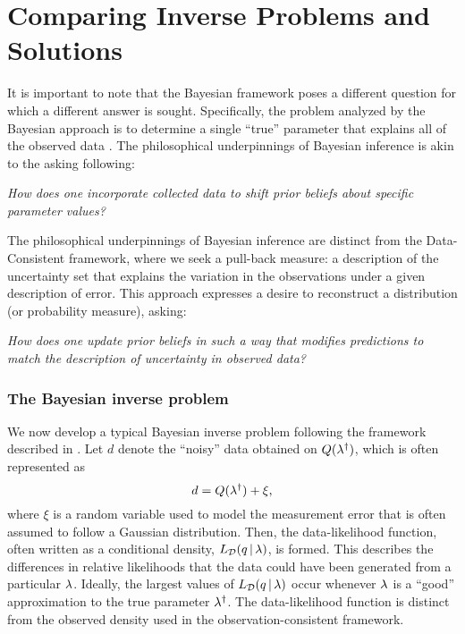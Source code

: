 \section{Comparing Inverse Problems and Solutions}\label{sec:compare}
It is important to note that the Bayesian framework poses a different question for which a different answer is sought.
Specifically, the problem analyzed by the Bayesian approach is to determine a single ``true'' parameter that explains all of the observed data \cite{Smith, Concrete, Complete}.
The philosophical underpinnings of Bayesian inference is akin to the asking following:

\begin{center}
  \emph{How does one incorporate collected data to shift prior beliefs about specific parameter values?}
\end{center}

The philosophical underpinnings of Bayesian inference are distinct from the Data-Consistent framework, where we seek a pull-back measure: a description of the uncertainty set that explains the variation in the observations under a given description of error.
This approach expresses a desire to reconstruct a distribution (or probability measure), asking:

\begin{center}
  \emph{How does one update prior beliefs in such a way that modifies predictions to match the description of uncertainty in observed data?}
\end{center}


\subsubsection{The Bayesian inverse problem}

We now develop a typical Bayesian inverse problem following the framework described in \cite{Stuart10}.
Let $d$ denote the ``noisy'' data obtained on $Q(\lambda^\dagger)$, which is often represented as
\begin{equation*}
	d = Q(\lambda^\dagger) + \xi,
\end{equation*}
where $\xi$ is a random variable used to model the measurement error that is often assumed to follow a Gaussian distribution.
Then, the data-likelihood function, often written as a conditional density, $L_{\mathcal{D}}(q \, |\, \lambda)$, is formed.
This describes the differences in relative likelihoods that the data could have been generated from a particular $\lambda$.
Ideally, the largest values of $L_{\mathcal{D}}(q \, | \, \lambda)$ occur whenever $\lambda$ is a ``good'' approximation to the true parameter $\lambda^\dagger$.
The data-likelihood function is distinct from the observed density used in the observation-consistent framework.

